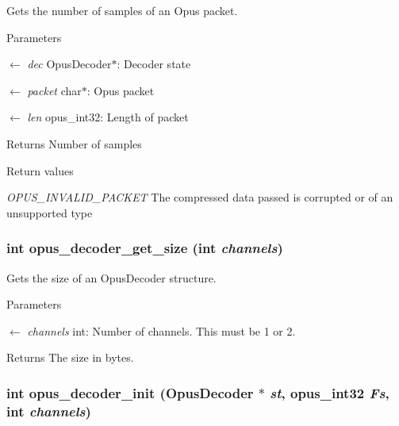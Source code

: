 Gets the number of samples of an Opus packet. 
\begin{DoxyParams}{Parameters}
\item[\mbox{$\leftarrow$} {\em dec}]{\ttfamily OpusDecoder$\ast$}: Decoder state \item[\mbox{$\leftarrow$} {\em packet}]{\ttfamily char$\ast$}: Opus packet \item[\mbox{$\leftarrow$} {\em len}]{\ttfamily opus\_\-int32}: Length of packet \end{DoxyParams}
\begin{DoxyReturn}{Returns}
Number of samples 
\end{DoxyReturn}

\begin{DoxyRetVals}{Return values}
\item[{\em OPUS\_\-INVALID\_\-PACKET}]The compressed data passed is corrupted or of an unsupported type \end{DoxyRetVals}
\hypertarget{group__opus__decoder_gac918415b2ee21add75b7f867ce235011}{
\subsubsection[{opus\_\-decoder\_\-get\_\-size}]{\setlength{\rightskip}{0pt plus 5cm}int opus\_\-decoder\_\-get\_\-size (int {\em channels})}}
\label{group__opus__decoder_gac918415b2ee21add75b7f867ce235011}


Gets the size of an {\ttfamily OpusDecoder} structure. 
\begin{DoxyParams}{Parameters}
\item[\mbox{$\leftarrow$} {\em channels}]{\ttfamily int}: Number of channels. This must be 1 or 2. \end{DoxyParams}
\begin{DoxyReturn}{Returns}
The size in bytes. 
\end{DoxyReturn}
\hypertarget{group__opus__decoder_ga939156d1f561c4273d5c62fa9c235a01}{
\subsubsection[{opus\_\-decoder\_\-init}]{\setlength{\rightskip}{0pt plus 5cm}int opus\_\-decoder\_\-init ({\bf OpusDecoder} $\ast$ {\em st}, \/  {\bf opus\_\-int32} {\em Fs}, \/  int {\em channels})}}
\label{group__opus__decoder_ga939156d1f561c4273d5c62fa9c235a01}



